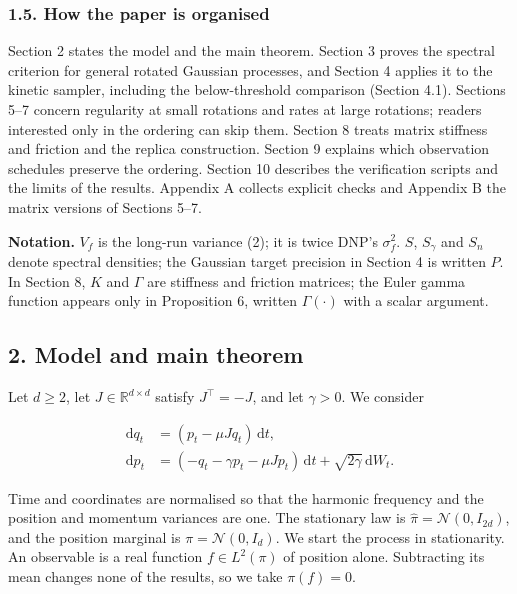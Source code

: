\documentclass[
  british,
  11pt,
  a4paper,
]{article}
\newcounter{none} %
\begin{document}
\subsubsection{1.5. How the paper is
organised}\label{how-the-paper-is-organised}

Section 2 states the model and the main theorem. Section 3 proves the
spectral criterion for general rotated Gaussian processes, and Section 4
applies it to the kinetic sampler, including the below-threshold
comparison (Section 4.1). Sections 5--7 concern regularity at small
rotations and rates at large rotations; readers interested only in the
ordering can skip them. Section 8 treats matrix stiffness and friction
and the replica construction. Section 9 explains which observation
schedules preserve the ordering. Section 10 describes the verification
scripts and the limits of the results. Appendix A collects explicit
checks and Appendix B the matrix versions of Sections 5--7.

\textbf{Notation.} \(V_f\) is the long-run variance (2); it is twice
DNP's \(\sigma_f^2\). \(S\), \(S_\gamma\) and \(S_n\) denote spectral
densities; the Gaussian target precision in Section 4 is written \(P\).
In Section 8, \(K\) and \(\Gamma\) are stiffness and friction matrices;
the Euler gamma function appears only in Proposition 6, written
\(\Gamma(\cdot)\) with a scalar argument.

\subsection{2. Model and main theorem}\label{model-and-main-theorem}

Let \(d\ge2\), let \(J\in\mathbb R^{d\times d}\) satisfy \(J^\top=-J\),
and let \(\gamma>0\). We consider

\[
\begin{aligned}
\mathrm dq_t&=(p_t-\mu Jq_t)\,\mathrm dt,\\
\mathrm dp_t&=(-q_t-\gamma p_t-\mu Jp_t)\,\mathrm dt
                 +\sqrt{2\gamma}\,\mathrm dW_t .
\end{aligned} \tag{1}
\]

Time and coordinates are normalised so that the harmonic frequency and
the position and momentum variances are one. The stationary law is
\(\widehat\pi=\mathcal N(0,I_{2d})\), and the position marginal is
\(\pi=\mathcal N(0,I_d)\). We start the process in stationarity. An
observable is a real function \(f\in L^2(\pi)\) of position alone.
Subtracting its mean changes none of the results, so we take
\(\pi(f)=0\).
\end{document}
